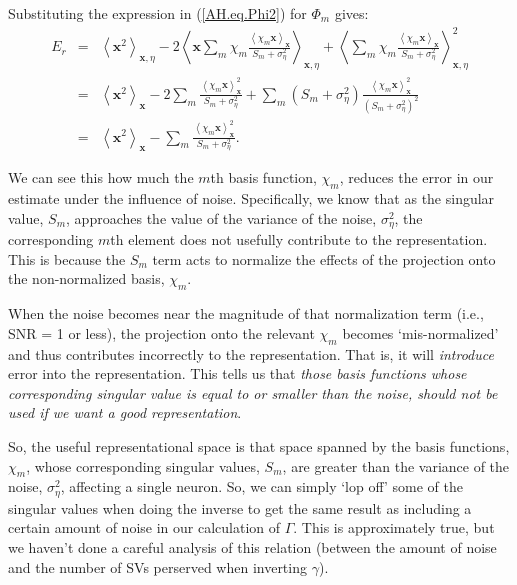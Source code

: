 \documentclass[10pt,letterpaper,oneside]{article}
\begin{document}
Substituting the expression in (\ref{AH.eq.Phi2}) for $\Phi_{m}$
gives:
\begin{eqnarray*}
E_{r} & = & \left\langle \mathbf{x}^{2}\right\rangle _{\mathbf{x},\eta}-2\left\langle \mathbf{x}\sum_{m}\chi_{m}\frac{\left\langle \chi_{m}\mathbf{x}\right\rangle _{\mathbf{x}}}{S_{m}+\sigma_{\eta}^{2}}\right\rangle _{\mathbf{x},\eta}+\left\langle \sum_{m}\chi_{m}\frac{\left\langle \chi_{m}\mathbf{x}\right\rangle _{\mathbf{x}}}{S_{m}+\sigma_{\eta}^{2}}\right\rangle _{\mathbf{x},\eta}^{2}\\
 & = & \left\langle \mathbf{x}^{2}\right\rangle _{\mathbf{x}}-2\sum_{m}\frac{\left\langle \chi_{m}\mathbf{x}\right\rangle _{\mathbf{x}}^{2}}{S_{m}+\sigma_{\eta}^{2}}+\sum_{m}(S_{m}+\sigma_{\eta}^{2})\frac{\left\langle \chi_{m}\mathbf{x}\right\rangle _{\mathbf{x}}^{2}}{\left(S_{m}+\sigma_{\eta}^{2}\right)^{2}}\\
 & = & \left\langle \mathbf{x}^{2}\right\rangle _{\mathbf{x}}-\sum_{m}\frac{\left\langle \chi_{m}\mathbf{x}\right\rangle _{\mathbf{x}}^{2}}{S_{m}+\sigma_{\eta}^{2}}.
\end{eqnarray*}

We can see this how much the $m$th basis function, $\chi_{m}$, reduces
the error in our estimate under the influence of noise. Specifically, we know that as the singular value, $S_{m}$, approaches
the value of the variance of the noise, $\sigma_{\eta}^{2}$, the
corresponding $m$th element does not usefully contribute to the representation.
This is because the $S_{m}$ term acts to normalize the effects of
the projection onto the non-normalized basis, $\chi_{m}$. 

When the noise becomes near the magnitude of that normalization term
(i.e., SNR = 1 or less), the projection onto the relevant $\chi_{m}$
becomes `mis-normalized' and thus contributes incorrectly to the representation.
That is, it will \emph{introduce} error into the representation. 
This tells us that \emph{those basis functions whose corresponding
singular value is equal to or smaller than the noise, should not be
used if we want a good representation}.

So, the useful representational space is that space spanned by the
basis functions, $\chi_{m}$, whose corresponding singular values,
$S_{m}$, are greater than the variance of the noise, $\sigma_{\eta}^{2}$,
affecting a single neuron.
So, we can simply `lop off' some of the singular values when doing
the inverse to get the same result as including a certain amount of
noise in our calculation of $\Gamma$. This is approximately true,
but we haven't done a careful analysis of this relation (between the
amount of noise and the number of SVs perserved when inverting $\gamma$).
\end{document}
